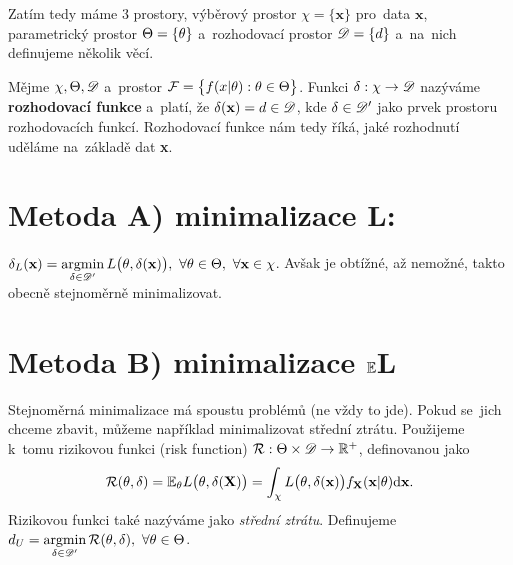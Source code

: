 Zatím tedy máme 3 prostory, výběrový prostor $\chi= \{\textbf{x}\}$ pro~data $\textbf{x}$, parametrický prostor $\Theta=\{\theta\}$ a~rozhodovací prostor $\mathscr{D}= \{d\}$ a~na~nich definujeme několik věcí.
\begin{define}
	Mějme $\chi,\Theta,\mathscr{D}$ a~prostor  $\mathcal{F}=\big\{ f(x|\theta):\theta\in\Theta \big\}$. Funkci $\delta:\chi\to\mathscr{D} $ nazýváme \textbf{rozhodovací funkce} a~platí, že $\delta(\textbf{x})=d\in\mathscr{D} $, kde $\delta\in\mathscr{D}'$ jako prvek prostoru rozhodovacích funkcí.  Rozhodovací funkce nám tedy říká, jaké rozhodnutí uděláme na~základě dat \textbf{x}.
\end{define}

\section{Metoda A) minimalizace L:} $\delta_L(\textbf{x})=\mathop{\mathrm{argmin}}\limits_{\delta\in\mathscr{D}'} L\big(\theta,\delta(\textbf{x})\big),~\forall \theta\in\Theta,~\forall\textbf{x}\in\chi$. Avšak je obtížné, až nemožné, takto obecně stejnoměrně minimalizovat.

\section{Metoda B) minimalizace $\mathbb{E} $L}
Stejnoměrná minimalizace má spoustu problémů (ne vždy to jde). Pokud se~jich chceme zbavit, můžeme například minimalizovat střední ztrátu. Použijeme k~tomu rizikovou funkci (risk function) $\mathcal{R}:\Theta\times\mathscr{D} \to\mathbb{R}^+$, definovanou jako $$\mathcal{R}(\theta,\delta)=\mathbb{E}_\theta L\big(\theta,\delta(\textbf{X})\big)=\int_\chi L\big(\theta,\delta(\textbf{x})\big)f_\textbf{X}(\textbf{x}|\theta)\mathrm{d}\textbf{x}.$$
	Rizikovou funkci také nazýváme jako \textit{střední ztrátu}. Definujeme $d_U=\mathop{\mathrm{argmin}}\limits_{\delta\in\mathscr{D}' } \mathcal{R}(\theta,\delta),~\forall\theta\in\Theta$.
	
